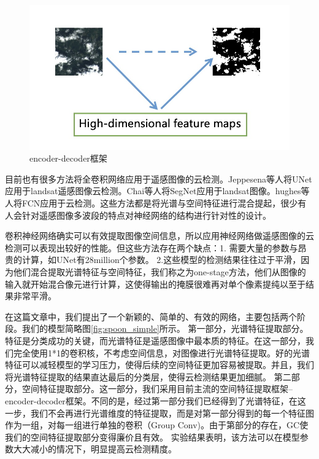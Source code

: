 \documentclass[UTF8]{ctexart}
\begin{document}
\begin{figure}[H]
    \centering
    \includegraphics[scale=0.3]{../pic/en-decoder.jpg}
    \caption{encoder-decoder框架}
    \label{fig:en-decoder}
\end{figure}


目前也有很多方法将全卷积网络应用于遥感图像的云检测。Jeppesena等人\cite{jeppesen2019cloud}将UNet应用于landsat遥感图像云检测。Chai等人\cite{chai2019cloud}将SegNet应用于landsat图像。hughes等人\cite{hughes2019high}将FCN应用于云检测。这些方法都是将光谱与空间特征进行混合提起，很少有人会针对遥感图像多波段的特点对神经网络的结构进行针对性的设计。

卷积神经网络确实可以有效提取图像空间信息，所以应用神经网络做遥感图像的云检测可以表现出较好的性能。但这些方法存在两个缺点：1. 需要大量的参数与昂贵的计算，如UNet有28million个参数。 2.这些模型的检测结果往往过于平滑，因为他们混合提取光谱特征与空间特征，我们称之为one-stage方法，他们从图像的输入就开始混合像元进行计算，这使得输出的掩膜很难再对单个像素提纯以至于结果非常平滑。

在这篇文章中，我们提出了一个新颖的、简单的、有效的网络，主要包括两个阶段。我们的模型简略图\ref{fig:spoon_simple}所示。
第一部分，光谱特征提取部分。特征是分类成功的关键，而光谱特征是遥感图像中最本质的特征。在这一部分，我们完全使用1*1的卷积核，不考虑空间信息，对图像进行光谱特征提取。好的光谱特征可以减轻模型的学习压力，使得后续的空间特征更加容易被提取。并且，我们将光谱特征提取的结果直达最后的分类层，使得云检测结果更加细腻。
第二部分，空间特征提取部分。这一部分，我们采用目前主流的空间特征提取框架--encoder-decoder框架。不同的是，经过第一部分我们已经得到了光谱特征，在这一步，我们不会再进行光谱维度的特征提取，而是对第一部分得到的每一个特征图作为一组，对每一组进行单独的卷积（Group Conv)。由于第部分的存在，GC使我们的空间特征提取部分变得廉价且有效。
实验结果表明，该方法可以在模型参数大大减小的情况下，明显提高云检测精度。
\end{document}
